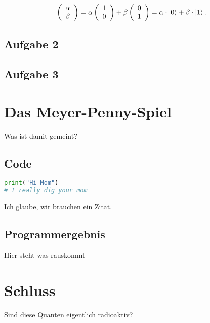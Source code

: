 \begin{align}
    \left(\begin{array}{c}
        \alpha\\
        \beta
    \end{array}\right) 
    =
    \alpha \left(\begin{array}{c}
        1\\
        0   
    \end{array}\right) 
    +
    \beta \left(\begin{array}{c}
        0\\
        1   
    \end{array}\right) 
    =
    \alpha \cdot \ket{0}+\beta \cdot \ket{1}.
\end{align}



\section{Aufgabe 2}
\section{Aufgabe 3}
\chapter{Das Meyer-Penny-Spiel}
Was ist damit gemeint?

\section{Code}
\begin{lstlisting}[caption=Python-Code \texttt{./mybestpython.py}, label=pythoncodebeispiel, language=python]
print("Hi Mom") 
# I really dig your mom
\end{lstlisting}
Ich glaube, wir brauchen ein Zitat\cite{NielsenChuang}.

\section{Programmergebnis}
Hier steht was rauskommt

\chapter{Schluss}
Sind diese Quanten eigentlich radioaktiv?
